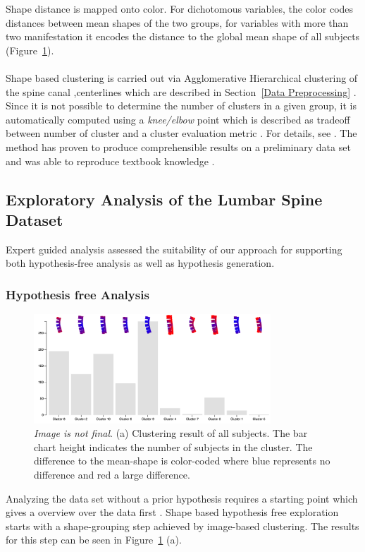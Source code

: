 \documentclass[journal]{style/vgtc} 			          %
\begin{document}
Shape distance is mapped onto color.
%
For dichotomous variables, the color codes distances between mean shapes of the two groups, for variables with more than two manifestation it encodes the distance to the global mean shape of all subjects (Figure~\ref{fig:hypothesisfree}).
\\\\
Shape based clustering is carried out via Agglomerative Hierarchical clustering of the spine canal ,centerlines which are described in Section~\ref{Data Preprocessing} \cite{Klemm2013VMV}.
%
Since it is not possible to determine the number of clusters in a given group, it is automatically computed using a \emph{knee/elbow} point which is described as tradeoff between number of cluster and a cluster evaluation metric \cite{Salvador2004}.
%
For details, see \cite{Klemm2013VMV}.
%
The method has proven to produce comprehensible results on a preliminary data set and was able to reproduce textbook knowledge \cite{Klemm2013VMV}.

\subsection{Exploratory Analysis of the Lumbar Spine Dataset}
%
Expert guided analysis assessed the suitability of our approach for supporting both hypothesis-free analysis as well as hypothesis generation.
%
\subsubsection{Hypothesis free Analysis} \label{Hypothesis free Analysis}
\begin{figure}[htb]
 \centering
 \includegraphics[width=3.5in]{figures/hypothesisfree}
 \caption{\emph{Image is not final}. (a) Clustering result of all subjects. The bar chart height indicates the number of subjects in the cluster. The difference to the mean-shape is color-coded where blue represents no difference and red a large difference.}
 \label{fig:hypothesisfree}
\end{figure}
%
Analyzing the data set without a prior hypothesis requires a starting point which gives a overview over the data first \cite{Shneiderman1996}.
%
Shape based hypothesis free exploration starts with a shape-grouping step achieved by image-based clustering.
%
The results for this step can be seen in Figure~\ref{fig:hypothesisfree} (a).
\end{document}
